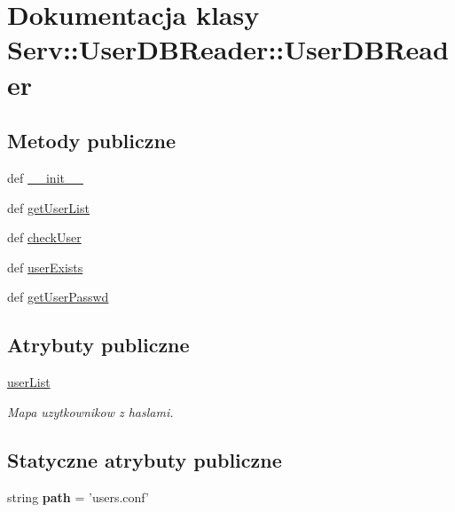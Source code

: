 \hypertarget{class_serv_1_1_user_d_b_reader_1_1_user_d_b_reader}{
\section{Dokumentacja klasy Serv::UserDBReader::UserDBReader}
\label{class_serv_1_1_user_d_b_reader_1_1_user_d_b_reader}
}
\subsection*{Metody publiczne}
\begin{CompactItemize}
\item 
def \hyperlink{class_serv_1_1_user_d_b_reader_1_1_user_d_b_reader_f3811b4b6123fe47153f9d87631322a9}{\_\-\_\-init\_\-\_\-}
\item 
def \hyperlink{class_serv_1_1_user_d_b_reader_1_1_user_d_b_reader_84890922ae8efd8ecec178874ec296f6}{getUserList}
\item 
def \hyperlink{class_serv_1_1_user_d_b_reader_1_1_user_d_b_reader_1fa47b601f3968090cf56b959f50ca94}{checkUser}
\item 
def \hyperlink{class_serv_1_1_user_d_b_reader_1_1_user_d_b_reader_e3a006e064956d5d09ad1bcaa4c3315f}{userExists}
\item 
def \hyperlink{class_serv_1_1_user_d_b_reader_1_1_user_d_b_reader_d77c35dbbb9ddf154ab8809463a254c0}{getUserPasswd}
\end{CompactItemize}
\subsection*{Atrybuty publiczne}
\begin{CompactItemize}
\item 
\hypertarget{class_serv_1_1_user_d_b_reader_1_1_user_d_b_reader_69dbf266bd3f0f66f21f30d5bd5fef82}{
\hyperlink{class_serv_1_1_user_d_b_reader_1_1_user_d_b_reader_69dbf266bd3f0f66f21f30d5bd5fef82}{userList}}
\label{class_serv_1_1_user_d_b_reader_1_1_user_d_b_reader_69dbf266bd3f0f66f21f30d5bd5fef82}

\begin{CompactList}\small\item\em Mapa uzytkownikow z haslami. \item\end{CompactList}\end{CompactItemize}
\subsection*{Statyczne atrybuty publiczne}
\begin{CompactItemize}
\item 
\hypertarget{class_serv_1_1_user_d_b_reader_1_1_user_d_b_reader_3988928f49345ddb03b5c11800721c3d}{
string \textbf{path} = 'users.conf'}
\label{class_serv_1_1_user_d_b_reader_1_1_user_d_b_reader_3988928f49345ddb03b5c11800721c3d}

\end{CompactItemize}


